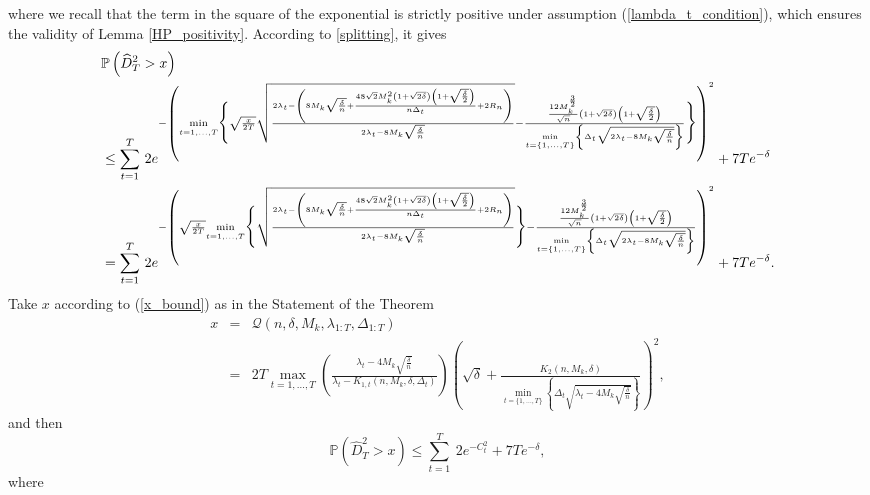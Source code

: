 \documentclass[twoside,11pt]{article}
\newcommand{\nb}{n}
\newcommand{\PPO}{\mathbb{P} }
\newcommand{\qmaj}{\mathcal{Q}}
\begin{document}
where we recall that the term in the square of the exponential is strictly positive under assumption (\ref{lambda_t_condition}), which ensures the validity of Lemma \ref{HP_positivity}. 
According to \eqref{splitting}, it gives
\begin{align}
    &\PPO \left(\widehat{D}^2_T > x \right) \notag \\
    &\leq \underset{t=1}{\overset{T}{\sum}} \ 2 e^{-\left( \underset{t=1,\ldots,T}{\min} \Bigg\{ \sqrt{\frac{x}{2T}} \sqrt{\frac{2\lambda_t - \left( 8 M_k \sqrt{\frac{\delta}{\nb}} + \frac{48 \sqrt{2} M_k^2 \left(1+ \sqrt{2\delta}\right) \left(1+ \sqrt{\frac{\delta}{2}}\right)}{\nb \Delta_t} + 2 R_{\nb}  \right)}{2\lambda_t - 8 M_k \sqrt{\frac{\delta}{\nb}}}} - \frac{\frac{12 M_k^{\frac{3}{2}}}{\sqrt{\nb}} \left(1+ \sqrt{2\delta}\right) \left(1+ \sqrt{\frac{\delta}{2}}\right)}{\underset{t=\{1,\ldots,T\}}{\min} \left\{\Delta_t \sqrt{2\lambda_t - 8 M_k \sqrt{\frac{\delta}{\nb}}} \right\}} \Bigg\} \right)^2} + 7 T e^{-\delta} \notag \\
    & = \underset{t=1}{\overset{T}{\sum}} \ 2 e^{-\left( \sqrt{\frac{x}{2T}} \underset{t=1,\ldots,T}{\min} \Bigg\{ \sqrt{\frac{2\lambda_t - \left( 8 M_k \sqrt{\frac{\delta}{\nb}} + \frac{48 \sqrt{2} M_k^2 \left(1+ \sqrt{2\delta}\right) \left(1+ \sqrt{\frac{\delta}{2}}\right)}{\nb \Delta_t} + 2 R_{\nb} \right)}{2\lambda_t - 8 M_k \sqrt{\frac{\delta}{\nb}}}}\Bigg\} - \frac{\frac{12 M_k^{\frac{3}{2}}}{\sqrt{\nb}} \left(1+ \sqrt{2\delta}\right) \left(1+ \sqrt{\frac{\delta}{2}}\right)}{\underset{t=\{1,\ldots,T\}}{\min} \left\{\Delta_t \sqrt{2\lambda_t - 8 M_k \sqrt{\frac{\delta}{\nb}}} \right\}} \right)^2} + 7 T e^{-\delta}.\notag 
\end{align}
Take $x$ according to (\ref{x_bound}) as in the Statement of the Theorem
\begin{eqnarray*}
x &= &    \qmaj (\nb, \delta,M_k,\lambda_{1:T},\Delta_{1:T})   \\
         &= &     2 T \underset{t=1,\ldots,T}{\max}  \left(\frac{\lambda_t - 4 M_k \sqrt{\frac{\delta}{\nb}}}{\lambda_t - K_{1,t}\left(\nb,M_k,\delta,\Delta_t \right) }  \right) \left(\sqrt{\delta} + \frac{K_2 \left( \nb,M_k,\delta \right)}{\underset{t=\{1,\ldots,T\}}{\min} \left\{\Delta_t \sqrt{\lambda_t - 4 M_k \sqrt{\frac{\delta}{\nb}}} \right\}} \right)^2,
\end{eqnarray*}
  and then
$$\PPO \left(\widehat{D}^2_T > x \right)    \leq  \underset{t=1}{\overset{T}{\sum}} \ 2 e^{-C_t^2} + 7 T e^{-\delta},$$ where
\end{document}
